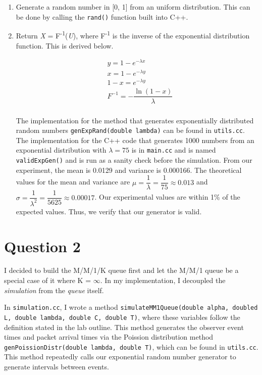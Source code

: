 \documentclass{article}
\begin{document}
\begin{enumerate}
    \item Generate a random number in [0, 1] from an uniform distribution. This can be done by calling the \texttt{rand()} function
          built into C++.
    \item Return \textit{X} = F\textsuperscript{-1}(\textit{U}), where F\textsuperscript{-1} is the inverse of the exponential distribution function. This is derived below.

        \begin{align*}
            &y = 1 - e^{-\lambda x} \\
            &x = 1 - e^{-\lambda y} \\
            &1 - x = e^{-\lambda y} \\
            &F^{-1} = -\dfrac{\ln (1 - x)}{\lambda} \\
        \end{align*}

        The implementation for the method that generates exponentially distributed random numbers
        \texttt{genExpRand(double lambda)} can be found in \texttt{utils.cc}.
        \newline \newline
        The implementation for the C++ code that generates 1000 numbers from an exponential distribution
        with $\lambda = 75$ is in \texttt{main.cc} and is named \texttt{validExpGen()} and is run as a sanity check
        before the simulation. From our experiment, the mean is 0.0129 and variance is 0.000166.
        The theoretical values for the mean and variance are $\mu = \dfrac{1}{\lambda} = \dfrac{1}{75} \approx 0.013$ and
        $\sigma = \dfrac{1}{\lambda^2} = \dfrac{1}{5625} \approx 0.00017$.
        Our experimental values are within 1\% of the expected values. Thus, we verify that our generator is valid.
\end{enumerate}



\section{Question 2}

I decided to build the M/M/1/K queue first and let the M/M/1 queue be a special case of it where K = $\infty$.
In my implementation, I decoupled the \textit{simulation} from the \textit{queue} itself. \newline


In \texttt{simulation.cc}, I wrote a method \texttt{simulateMM1Queue(double alpha, doubled L, double lambda, double C, double T)},
where these variables follow the definition stated in the lab outline. This method generates the observer event times and packet arrival
times via the Poission distribution method \texttt{genPoissionDistr(double lambda, double T)}, which can be found in
\texttt{utils.cc}. This method repeatedly calls our exponential random number generator to generate
intervals between events. \newline
\end{document}
